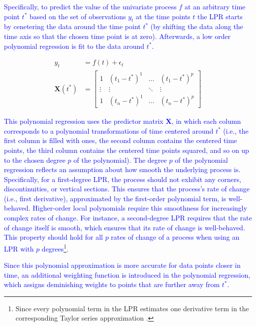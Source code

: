 \documentclass[man, floatsintext]{apa7}
\begin{document}
\textcolor{blue}{
  Specifically, to predict the value of the univariate process $f$ at an
  arbitrary time point $t^*$ based on the set of observations $y_t$ at the time
  points $t$ the LPR starts by cenetering the data around the time point $t^*$
  (by shifting the data along the time axis so that the chosen time point is at
  zero). Afterwards, a low order polynomial regression is fit to the data
  around $t^*$.
}

\begin{align}
  y_t             & = f(t) + \epsilon_t \\
  \textbf{X}(t^*) & =
  \begin{bmatrix}
    1      & (t_1 - t^*)^1 & \dots  & (t_1 - t^*)^p \\
    \vdots & \vdots        & \ddots & \vdots        \\
    1      & (t_n - t^*)^1 & \dots  & (t_n - t^*)^p
  \end{bmatrix}
  \label{eq:lpr_equations_mod_mat}
\end{align}

\noindent\textcolor{blue}{
  This polynomial regression uses the predictor matrix $\textbf{X}$, in which
  each column corresponds to a polynomial transformations of time centered
  around $t^*$ (i.e., the first column is filled with ones, the second column
  contains the centered time points, the third column contains the centered
  time points squared, and so on up to the chosen degree $p$ of the
  polynomial). The degree $p$ of the polynomial regression reflects an
  assumption about how smooth the underlying process is. Specifically, for a
  first-degree LPR, the process should not exhibit any corners,
  discontinuities, or vertical sections. This ensures that the process's rate
  of change (i.e., first derivative), approximated by the first-order
  polynomial term, is well-behaved. Higher-order local polynomials require this
  smoothness for increasingly complex rates of change. For instance, a
  second-degree LPR requires that the rate of change itself is smooth, which
  ensures that its rate of change is well-behaved. This property should hold
  for all $p$ rates of change of a process when using an LPR with $p$
  degrees\footnote{Since every polynomial term in the LPR estimates one
    derivative term in the corresponding Taylor series approximation
    \parencite{avery_literature_nodate}.}.
}

\textcolor{blue}{
  Since this polynomial approximation is more accurate for data points closer
  in time, an additional weighting function is introduced in the polynomial
  regression, which assigns deminishing weights to points that are further away
  from $t^*$.
}
\end{document}
